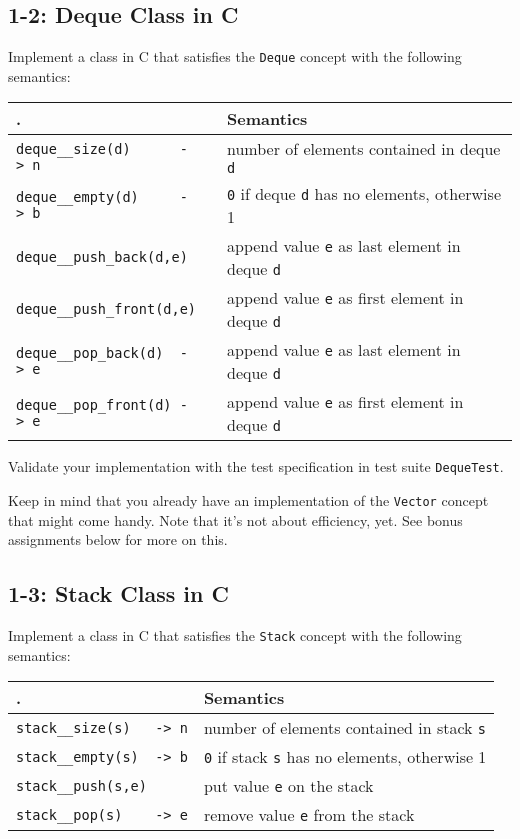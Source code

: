 \documentclass[]{article}
\begin{document}
\subsection{1-2: Deque Class in C}\label{deque-class-in-c}

Implement a class in C that satisfies the \texttt{Deque} concept with
the following semantics:

\begin{longtable}[c]{@{}ll@{}}
\toprule
. & Semantics \tabularnewline
\midrule
\endhead
\texttt{deque\_\_size(d)\ \ \ \ \ \ -\textgreater{}\ n} & number of
elements contained in deque \texttt{d}\tabularnewline
\texttt{deque\_\_empty(d)\ \ \ \ \ -\textgreater{}\ b} & \texttt{0} if
deque \texttt{d} has no elements, otherwise 1\tabularnewline
\texttt{deque\_\_push\_back(d,e)} & append value \texttt{e} as last
element in deque \texttt{d}\tabularnewline
\texttt{deque\_\_push\_front(d,e)} & append value \texttt{e} as first
element in deque \texttt{d}\tabularnewline
\texttt{deque\_\_pop\_back(d)\ \ -\textgreater{}\ e} & append value
\texttt{e} as last element in deque \texttt{d}\tabularnewline
\texttt{deque\_\_pop\_front(d)\ -\textgreater{}\ e} & append value
\texttt{e} as first element in deque \texttt{d}\tabularnewline
\bottomrule
\end{longtable}

Validate your implementation with the test specification in test suite
\texttt{DequeTest}.

Keep in mind that you already have an implementation of the
\texttt{Vector} concept that might come handy. Note that it's not about
efficiency, yet. See bonus assignments below for more on this.

\subsection{1-3: Stack Class in C}\label{stack-class-in-c}

Implement a class in C that satisfies the \texttt{Stack} concept with
the following semantics:

\begin{longtable}[c]{@{}ll@{}}
\toprule
. & Semantics \tabularnewline
\midrule
\endhead
\texttt{stack\_\_size(s)\ \ \ -\textgreater{}\ n} & number of elements
contained in stack \texttt{s}\tabularnewline
\texttt{stack\_\_empty(s)\ \ -\textgreater{}\ b} & \texttt{0} if stack
\texttt{s} has no elements, otherwise 1\tabularnewline
\texttt{stack\_\_push(s,e)} & put value \texttt{e} on the
stack\tabularnewline
\texttt{stack\_\_pop(s)\ \ \ \ -\textgreater{}\ e} & remove value
\texttt{e} from the stack\tabularnewline
\bottomrule
\end{longtable}
\end{document}
